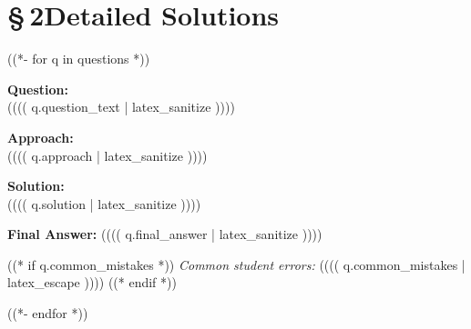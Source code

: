 \documentclass[11pt,a4paper]{article}
\begin{document}
\section*{\color{headerBlue}\S\,2\quad Detailed Solutions}

((*- for q in questions *))
\begin{tcolorbox}[
  title={\bfseries Question (((( q.number )))) \hfill Difficulty: (((( q.difficulty | latex_escape ))))},
  colback=boxBg, colframe=headerBlue!60,
  coltitle=white, colbacktitle=headerBlue!80,
  arc=3pt, boxrule=0.6pt, breakable,
  left=6pt, right=6pt
]

\textbf{Question:} \\
(((( q.question_text | latex_sanitize ))))

\medskip
\textbf{Approach:} \\
(((( q.approach | latex_sanitize ))))

\medskip
\textbf{Solution:} \\
(((( q.solution | latex_sanitize ))))

\medskip
\textbf{\color{conciseGreen}Final Answer:} (((( q.final_answer | latex_sanitize ))))

((* if q.common_mistakes *))
\medskip
\textit{\color{dimLabel}Common student errors:} (((( q.common_mistakes | latex_escape ))))
((* endif *))

\end{tcolorbox}
\vspace{0.6em}
((*- endfor *))
\end{document}
